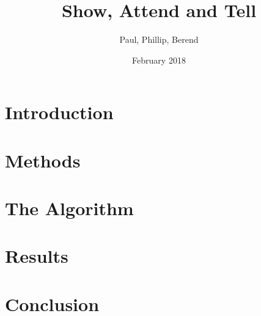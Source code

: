 \documentclass[12pt, letterpaper, twoside]{article}
\title{Show, Attend and Tell}
\author{Paul, Phillip, Berend}
\date{February 2018}
\begin{document}
 
\begin{titlepage}
\end{titlepage}
\maketitle
\tableofcontents
\newpage

\section{Introduction}

\section{Methods}

\section{The Algorithm}

\section{Results}

\section{Conclusion}
\end{document}
